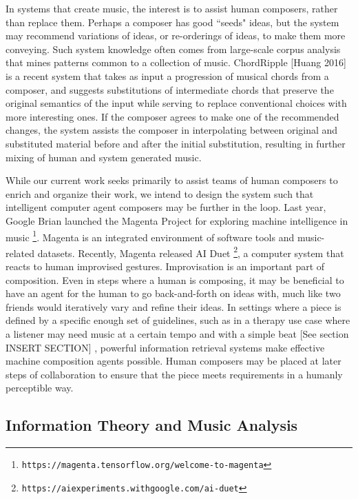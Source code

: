 \documentclass[final,authoryear,5p,times,twocolumn]{elsarticle}
\begin{document}
In systems that create music, the interest is to assist human composers, rather than replace them. Perhaps a composer has good ``seeds" ideas, but the system may recommend variations of ideas, or re-orderings of ideas, to make them more conveying. Such system knowledge often comes from large-scale corpus analysis that mines patterns common to a collection of music. ChordRipple [Huang 2016] is a recent system that takes as input a progression of musical chords from a composer, and suggests substitutions of intermediate chords that preserve the original semantics of the input while serving to replace conventional choices with more interesting ones. If the composer agrees to make one of the recommended changes, the system assists the composer in interpolating between original and substituted material before and after the initial substitution, resulting in further mixing of human and system generated music.

While our current work seeks primarily to assist teams of human composers to enrich and organize their work, we intend to design the system such that intelligent computer agent composers may be further in the loop. Last year, Google Brian launched the Magenta Project for exploring machine intelligence in music \footnote{\texttt{https://magenta.tensorflow.org/welcome-to-magenta}}. Magenta is an integrated environment of software tools and music-related datasets. Recently, Magenta released AI Duet \footnote{\texttt{https://aiexperiments.withgoogle.com/ai-duet}}, a computer system that reacts to human improvised gestures. Improvisation is an important part of composition. Even in steps where a human is composing, it may be beneficial to have an agent for the human to go back-and-forth on ideas with, much like two friends would iteratively vary and refine their ideas. In settings where a piece is defined by a specific enough set of guidelines, such as in a therapy use case where a listener may need music at a certain tempo and with a simple beat [See section INSERT SECTION] , powerful information retrieval systems make effective machine composition agents possible. Human composers may be placed at later steps of collaboration to ensure that the piece meets requirements in a humanly perceptible way.

\subsection{Information Theory and Music Analysis}
\end{document}
